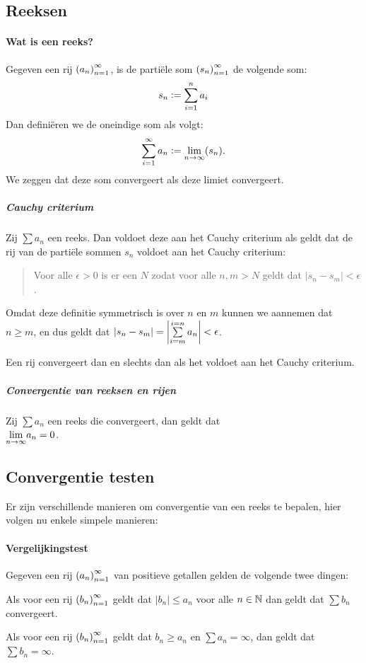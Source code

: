 \subsection{Reeksen}
\paragraph{Wat is een reeks?} Gegeven een rij \(\left(a_{n}\right)_{n=1}^{\infty}\), is de partiële som \(\left(s_{n}\right)_{n=1}^{\infty}\) de volgende som:
\[
    s_{n}\vcentcolon=\sum\limits_{i=1}^{n}a_{i}
\]
Dan definiëren we de oneindige som als volgt:
\[
    \sum\limits_{i=1}^{\infty}a_{n}\vcentcolon=\underset{n\to\infty}{\text{lim}}(s_{n}).
\]
We zeggen dat deze som convergeert als deze limiet convergeert.

\subparagraph{Cauchy criterium} Zij \(\sum a_{n}\) een reeks. Dan voldoet deze aan het Cauchy criterium als geldt dat de rij van de partiële sommen \(s_{n}\) voldoet aan het Cauchy criterium:

\begin{quotation}
    Voor alle \(\epsilon>0\) is er een \(N\) zodat voor alle \(n,m>N\) geldt dat \(\left|s_{n}-s_{m}\right|<\epsilon\).
\end{quotation}

Omdat deze definitie symmetrisch is over \(n\) en \(m\) kunnen we aannemen dat \(n\geq m\), en dus geldt dat \(|s_{n}-s_{m}|=\left|\sum\limits_{i=m}^{i=n}a_{n}\right|<\epsilon\).

Een rij convergeert dan en slechts dan als het voldoet aan het Cauchy criterium.

\subparagraph{Convergentie van reeksen en rijen} Zij \(\sum a_{n}\) een reeks die convergeert, dan geldt dat\\\(\underset{n\to\infty}{\text{lim}}a_{n}=0\).

\subsection{Convergentie testen}
Er zijn verschillende manieren om convergentie van een reeks te bepalen, hier volgen nu enkele simpele manieren:
\paragraph{Vergelijkingstest} Gegeven een rij \(\left(a_{n}\right)_{n=1}^{\infty}\) van positieve getallen gelden de volgende twee dingen:
\begin{items}
    \item Als voor een rij \(\left(b_{n}\right)_{n=1}^{\infty}\) geldt dat \(|b_{n}|\leq a_{n}\) voor alle \(n\in\mathbb{N}\) dan geldt dat \(\sum b_{n}\) convergeert.
    \item Als voor een rij \(\left(b_{n}\right)_{n=1}^{\infty}\) geldt dat \(b_{n}\geq a_{n}\) en \(\sum a_{n}=\infty\), dan geldt dat \(\sum b_{n}=\infty\).
\end{items}


